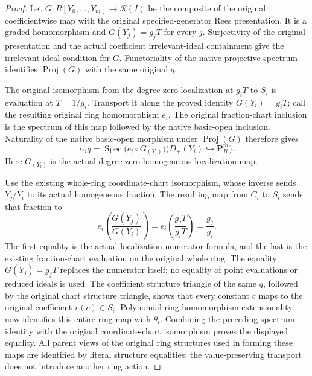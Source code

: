 \begin{proof}
Let $G:R[Y_0,\ldots,Y_m]\to\mathcal R(I)$ be the composite of the
original coefficientwise map with the original specified-generator Rees
presentation.  It is a graded homomorphism and
$G(Y_j)=g_jT$ for every $j$.  Surjectivity of the original presentation
and the actual coefficient irrelevant-ideal containment give the
irrelevant-ideal condition for $G$.  Functoriality of the native
projective spectrum identifies $\operatorname{Proj}(G)$ with the same
original $q$.

The original isomorphism from the degree-zero localization at $g_iT$
to $S_i$ is evaluation at $T=1/g_i$.  Transport it along the proved
identity $G(Y_i)=g_iT$; call the resulting original ring homomorphism
$e_i$.  The original fraction-chart inclusion is the spectrum of this
map followed by the native basic-open inclusion.  Naturality of the
native basic-open morphism under $\operatorname{Proj}(G)$ therefore gives
\[
 \alpha_i q=
 \operatorname{Spec}\bigl(e_i\circ G_{(Y_i)}\bigr)
       \bigl(D_+(Y_i)\hookrightarrow\mathbf P_R^m\bigr).
\]
Here $G_{(Y_i)}$ is the actual degree-zero homogeneous-localization map.

Use the existing whole-ring coordinate-chart isomorphism, whose inverse
sends $Y_j/Y_i$ to its actual homogeneous fraction.  The resulting map
from $C_i$ to $S_i$ sends that fraction to
\[
 e_i\!\left(\frac{G(Y_j)}{G(Y_i)}\right)
   =e_i\!\left(\frac{g_jT}{g_iT}\right)=\frac{g_j}{g_i}.
\]
The first equality is the actual localization numerator formula, and
the last is the existing fraction-chart evaluation on the original
whole ring.  The equality $G(Y_j)=g_jT$ replaces the numerator itself;
no equality of point evaluations or reduced ideals is used.
The coefficient structure triangle of the same $q$, followed by the
original chart structure triangle, shows that every constant $c$ maps
to the original coefficient $r(c)\in S_i$.  Polynomial-ring
homomorphism extensionality now identifies this entire ring map with
$\theta_i$.  Combining the preceding spectrum identity with the
original coordinate-chart isomorphism proves the displayed equality.
All parent views of the original ring structures used in forming these
maps are identified by literal structure equalities; the value-preserving
transport does not introduce another ring action.
\end{proof}
